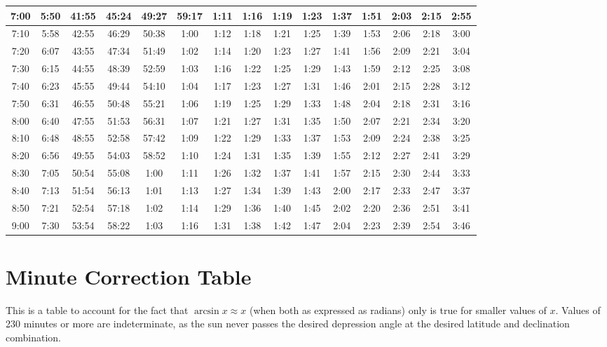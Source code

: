 \begin{footnotesize}
\begin{tabular}{c | c | c | c | c | c | c | c | c | c | c | c | c | c | c}
		7:00&5:50&41:55&45:24&49:27&59:17&1:11&1:16&1:19&1:23&1:37&1:51&2:03&2:15&2:55\\\hline
		7:10&5:58&42:55&46:29&50:38&1:00&1:12&1:18&1:21&1:25&1:39&1:53&2:06&2:18&3:00\\\hline
		7:20&6:07&43:55&47:34&51:49&1:02&1:14&1:20&1:23&1:27&1:41&1:56&2:09&2:21&3:04\\\hline
		7:30&6:15&44:55&48:39&52:59&1:03&1:16&1:22&1:25&1:29&1:43&1:59&2:12&2:25&3:08\\\hline
		7:40&6:23&45:55&49:44&54:10&1:04&1:17&1:23&1:27&1:31&1:46&2:01&2:15&2:28&3:12\\\hline
		7:50&6:31&46:55&50:48&55:21&1:06&1:19&1:25&1:29&1:33&1:48&2:04&2:18&2:31&3:16\\\hline
		8:00&6:40&47:55&51:53&56:31&1:07&1:21&1:27&1:31&1:35&1:50&2:07&2:21&2:34&3:20\\\hline
		8:10&6:48&48:55&52:58&57:42&1:09&1:22&1:29&1:33&1:37&1:53&2:09&2:24&2:38&3:25\\\hline
		8:20&6:56&49:55&54:03&58:52&1:10&1:24&1:31&1:35&1:39&1:55&2:12&2:27&2:41&3:29\\\hline
		8:30&7:05&50:54&55:08&1:00&1:11&1:26&1:32&1:37&1:41&1:57&2:15&2:30&2:44&3:33\\\hline
		8:40&7:13&51:54&56:13&1:01&1:13&1:27&1:34&1:39&1:43&2:00&2:17&2:33&2:47&3:37\\\hline
		8:50&7:21&52:54&57:18&1:02&1:14&1:29&1:36&1:40&1:45&2:02&2:20&2:36&2:51&3:41\\\hline
		9:00&7:30&53:54&58:22&1:03&1:16&1:31&1:38&1:42&1:47&2:04&2:23&2:39&2:54&3:46\\\hline
\end{tabular}\end{footnotesize}\newpage

\section{Minute Correction Table}

This is a table to account for the fact that $\arcsin x \approx x$ (when both as expressed as radians) only is true for smaller values of $x$. Values of 230 minutes or more are indeterminate, as the sun never passes the desired depression angle at the desired latitude and declination combination.

